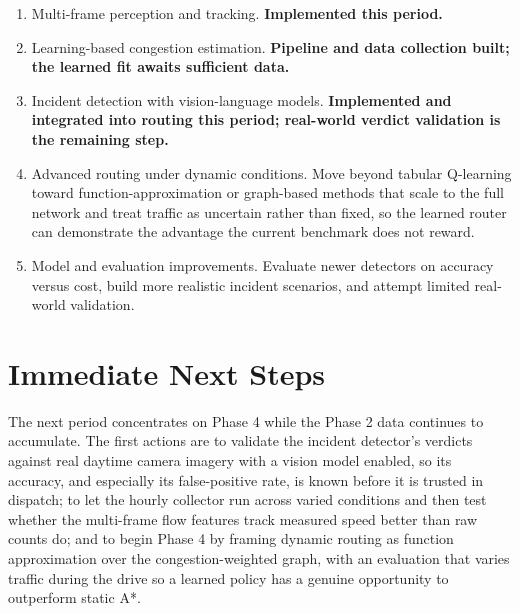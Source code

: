 \documentclass[12pt]{article}
\begin{document}
\begin{enumerate}[leftmargin=1.8em, itemsep=3pt]
  \item Multi-frame perception and tracking. \textbf{Implemented this period.}
  \item Learning-based congestion estimation. \textbf{Pipeline and data collection
    built; the learned fit awaits sufficient data.}
  \item Incident detection with vision-language models. \textbf{Implemented and
    integrated into routing this period; real-world verdict validation is the
    remaining step.}
  \item Advanced routing under dynamic conditions. Move beyond tabular Q-learning
    toward function-approximation or graph-based methods that scale to the full
    network and treat traffic as uncertain rather than fixed, so the learned
    router can demonstrate the advantage the current benchmark does not reward.
  \item Model and evaluation improvements. Evaluate newer detectors on accuracy
    versus cost, build more realistic incident scenarios, and attempt limited
    real-world validation.
\end{enumerate}

\section{Immediate Next Steps}

The next period concentrates on Phase 4 while the Phase 2 data continues to
accumulate. The first actions are to validate the incident detector's verdicts
against real daytime camera imagery with a vision model enabled, so its accuracy,
and especially its false-positive rate, is known before it is trusted in dispatch;
to let the hourly collector run across varied conditions and then test whether the
multi-frame flow features track measured speed better than raw counts do; and to
begin Phase 4 by framing dynamic routing as function approximation over the
congestion-weighted graph, with an evaluation that varies traffic during the drive
so a learned policy has a genuine opportunity to outperform static A*.
\end{document}
